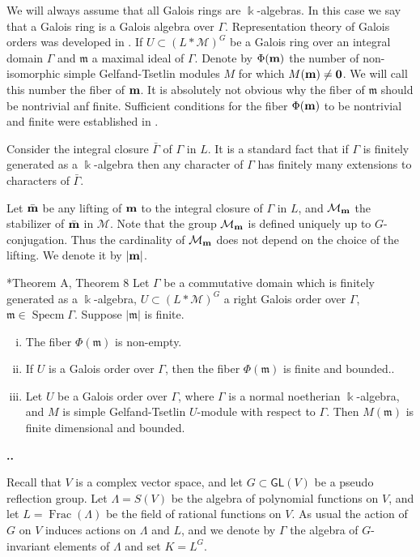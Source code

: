\documentclass[11pt,fleqn]{amsart}
\renewcommand\thesection{\arabic{section}}
\newcounter{para}[section]
\renewcommand\thepara{\thesection.\arabic{para}}
\def\paragraph{%
 \noindent
 \refstepcounter{para}%
 \textbf{\thepara.}\hspace{1ex}%
}
\renewcommand\k{\Bbbk}
\newcommand\m{\mathfrak m}
\DeclareMathOperator\Frac{Frac}
\DeclareMathOperator\Specm{Specm}
\begin{document}
We will always assume that all Galois rings are $\k$-algebras. In this case we 
say that a Galois ring is a Galois algebra over $\Gamma$. Representation 
theory of Galois orders was developed in \cite{FO-fibers-gt}. If $U\subset 
(L*\mathcal M)^{G}$ be a Galois ring over an integral domain $\Gamma$ and $\m$ 
a maximal ideal of $\Gamma $. Denote by $\Phi(\bf m)$ the number of 
non-isomorphic simple Gelfand-Tsetlin modules $M$ for which $M(\bf m)\neq 0$. 
We will call this number the fiber of $\bf m$. It is absolutely not obvious 
why the fiber of $\m$ should be nontrivial anf finite. Sufficient conditions 
for the fiber $\Phi(\bf m)$ to be nontrivial and finite were established in 
\cite{FO-fibers-gt}. 

Consider the integral closure $\bar{\Gamma}$ of $\Gamma$ in $L$. It is a 
standard fact that if $\Gamma$ is finitely generated as a $\k$-algebra then 
any character of $\Gamma$ has finitely many extensions to characters of 
$\bar{\Gamma}$. 

Let $\bar{\bf m}$ be any lifting of $\bf m$ to the integral closure of $\Gamma$
in $L$, and $\mathcal M_{\bf m}$ the stabilizer of $\bar{\bf m}$ in $\mathcal 
M$. Note that the group $\mathcal M_{\bf m}$ is defined uniquely up to 
$G$-conjugation. Thus the cardinality of $\mathcal M_{\bf m}$ does not depend 
on the choice of the lifting. We denote it by $|\bf m|$.

\begin{Theorem}{\cite{FO-fibers-gt}*{Theorem A, Theorem 8}}
\label{theorem-extension} 
Let $\Gamma$ be a commutative domain
which is finitely generated as a $\k$-algebra, $U\subset (L*\mathcal M)^{G}$ a 
right Galois order over $\Gamma$, $\m \in \Specm \Gamma$. Suppose $|\m|$ is 
finite.
\begin{enumerate}[(i)]
\item\label{fiber-nontrivial} The fiber $\Phi(\m)$ is non-empty.
\item\label{fiber-finite} If $U$ is a
 Galois order over
$\Gamma$, then the fiber $\Phi(\m)$ is finite and bounded..
\item Let $U$ be a Galois order over $\Gamma$, where $\Gamma$ is a
normal noetherian $\k$-algebra, and  $M$ is simple Gelfand-Tsetlin $U$-module 
with respect to $\Gamma$. Then $M(\m)$ is finite dimensional and bounded.
\end{enumerate}
\end{Theorem}


\paragraph
\label{L:translations}
Recall that $V$ is a complex vector space, and let $G \subset \mathsf{GL}(V)$ 
be a pseudo reflection group. 
Let $\Lambda = S(V)$ be the algebra of polynomial functions on $V$, and let
$L = \Frac(\Lambda)$ be the field of rational functions on $V$. As usual the
action of $G$ on $V$ induces actions on $\Lambda$ and $L$, and we denote by
$\Gamma$ the algebra of $G$-invariant elements of $\Lambda$ and set $K = L^G$.
\end{document}
